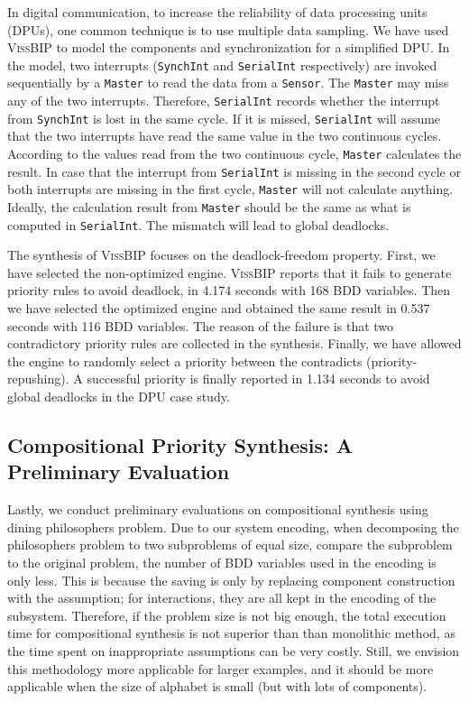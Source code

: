 \documentclass[10pt, a4paper, onecolumn, conference, compsocconf]{IEEEtran}
\begin{document}
In digital communication, to increase the reliability of data processing units (DPUs), one common technique is to use multiple data sampling.
We have used \textsc{VissBIP} to model the components and synchronization for a simplified DPU. In the model, two interrupts (\texttt{SynchInt} and \texttt{SerialInt} respectively) are invoked sequentially by a \texttt{Master} to read the data from a \texttt{Sensor}. The \texttt{Master} may miss any of the two interrupts. Therefore, \texttt{SerialInt} records whether the interrupt from \texttt{SynchInt} is lost in the same cycle. If it is missed, \texttt{SerialInt} will assume that the two interrupts have read the same value in the two continuous cycles. According to the values read from the two continuous cycle, \texttt{Master} calculates the result. In case that the interrupt from \texttt{SerialInt} is missing in the second cycle or both interrupts are missing in the first cycle, \texttt{Master} will not calculate anything. Ideally, the calculation result from \texttt{Master} should be the same as what is computed in \texttt{SerialInt}. The mismatch will lead to global deadlocks.

The synthesis of \textsc{VissBIP} focuses on the deadlock-freedom property. First, we have selected the non-optimized engine. \textsc{VissBIP} reports that it fails to generate priority rules to avoid deadlock, in 4.174 seconds with 168 BDD variables. Then we have selected the optimized engine and obtained the same result in 0.537 seconds with 116 BDD variables. The reason of the failure is that two contradictory priority rules are collected in the synthesis. Finally, we have allowed the engine to randomly select a priority between the contradicts (priority-repushing). A successful priority is finally reported in 1.134 seconds to avoid global deadlocks in the DPU case study.

\subsection{Compositional Priority Synthesis: A Preliminary Evaluation\label{appsub.algo.prioritysyn.compositional.evaluation}}

Lastly, we conduct preliminary evaluations on compositional synthesis using dining philosophers problem. Due to our system encoding, when decomposing the philosophers problem to two subproblems of equal size, compare the subproblem to the original problem, the number of BDD variables used in the encoding is only  less. This is because the saving is only by replacing component construction with the assumption; for interactions, they are all kept in the encoding of the subsystem. Therefore, if the problem size is not big enough, the total execution time for compositional synthesis is not superior than than monolithic method, as the time spent on inappropriate assumptions can be very costly. Still, we envision this methodology more applicable for larger examples, and it should be more applicable when the size of alphabet is small (but with lots of components).
\end{document}
